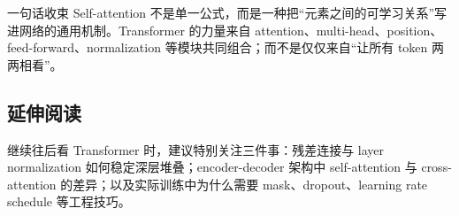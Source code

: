\documentclass[a4paper]{article}
\begin{document}
\begin{importantbox}{一句话收束}
    Self-attention 不是单一公式，而是一种把“元素之间的可学习关系”写进网络的通用机制。Transformer 的力量来自 attention、multi-head、position、feed-forward、normalization 等模块共同组合；而不是仅仅来自“让所有 token 两两相看”。
\end{importantbox}

\subsection{延伸阅读}

继续往后看 Transformer 时，建议特别关注三件事：残差连接与 layer normalization 如何稳定深层堆叠；encoder-decoder 架构中 self-attention 与 cross-attention 的差异；以及实际训练中为什么需要 mask、dropout、learning rate schedule 等工程技巧。
\end{document}
